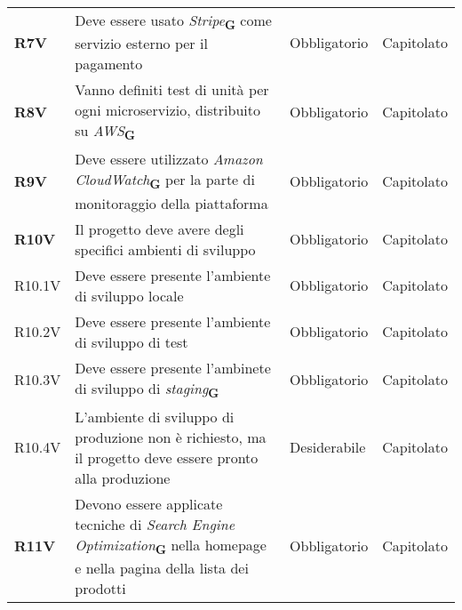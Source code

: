 \begin{center}
\begin{longtable}[!h]{p{50px} p{200px} p{100px} p{50px}}
        \textbf{R7V}                          & Deve essere usato \textit{Stripe}\textsubscript{\textbf{G}} come servizio esterno per il pagamento                                                       & Obbligatorio             & Capitolato     \\
        \textbf{R8V}                          & Vanno definiti test di unità per ogni microservizio, distribuito su \textit{AWS}\textsubscript{\textbf{G}}                                               & Obbligatorio             & Capitolato     \\
        \textbf{R9V}                          & Deve essere utilizzato \textit{Amazon CloudWatch}\textsubscript{\textbf{G}} per la parte di monitoraggio della piattaforma                               & Obbligatorio             & Capitolato     \\
        \textbf{R10V}                         & Il progetto deve avere degli specifici ambienti di sviluppo                                                                                              & Obbligatorio             & Capitolato     \\
        R10.1V                                & Deve essere presente l'ambiente di sviluppo locale                                                                                                       & Obbligatorio             & Capitolato     \\
        R10.2V                                & Deve essere presente l'ambiente di sviluppo di test                                                                                                      & Obbligatorio             & Capitolato     \\
        R10.3V                                & Deve essere presente l'ambinete di sviluppo di \textit{staging}\textsubscript{\textbf{G}}                                                                & Obbligatorio             & Capitolato     \\
        R10.4V                                & L'ambiente di sviluppo di produzione non è richiesto, ma il progetto deve essere pronto alla produzione                                                  & Desiderabile             & Capitolato     \\
        \textbf{R11V}                         & Devono essere applicate tecniche di \textit{Search Engine Optimization}\textsubscript{\textbf{G}} nella homepage e nella pagina della lista dei prodotti & Obbligatorio             & Capitolato     \\
           \end{longtable}
\end{center}

